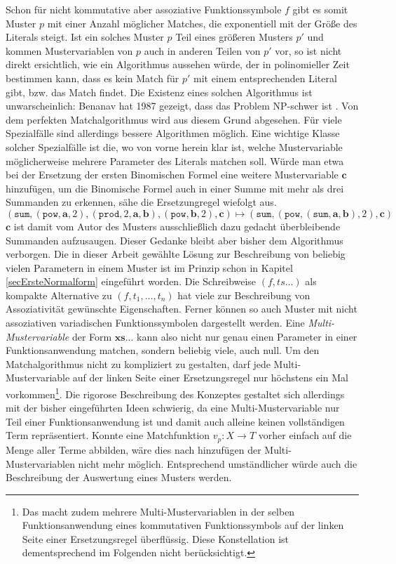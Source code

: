 Schon für nicht kommutative aber assoziative Funktionssymbole $f$ gibt es somit Muster $p$ mit einer Anzahl möglicher Matches, die exponentiell mit der Größe des Literals steigt. Ist ein solches Muster $p$ Teil eines größeren Musters $p'$ und kommen Mustervariablen von $p$ auch in anderen Teilen von $p'$ vor, so ist nicht direkt ersichtlich, wie ein Algorithmus aussehen würde, der in polinomieller Zeit bestimmen kann, dass es kein Match für $p'$ mit einem entsprechenden Literal gibt, bzw. das Match findet. Die Existenz eines solchen Algorithmus ist unwarscheinlich: Benanav hat 1987 gezeigt, dass das Problem NP-schwer ist \cite{NPHardMatching}.
Von dem perfekten Matchalgorithmus wird aus diesem Grund abgesehen. Für viele Spezialfälle sind allerdings bessere Algorithmen möglich. Eine wichtige Klasse solcher Spezialfälle ist die, wo von vorne herein klar ist, welche Mustervariable möglicherweise mehrere Parameter des Literals matchen soll. Würde man etwa bei der Ersetzung der ersten Binomischen Formel eine weitere Mustervariable $\mathbf c$ hinzufügen, um die Binomische Formel auch in einer Summe mit mehr als drei Summanden zu erkennen, sähe die Ersetzungregel wiefolgt aus.
$$(\texttt{sum}, (\texttt{pow}, \mathbf a, 2), (\texttt{prod}, 2, \mathbf a, \mathbf b), (\texttt{pow}, \mathbf b, 2), \mathbf c) \mapsto (\texttt{sum}, (\texttt{pow}, (\texttt{sum}, \mathbf a, \mathbf b), 2), \mathbf c)$$
$\mathbf c$ ist damit vom Autor des Musters ausschließlich dazu gedacht überbleibende Summanden \glqq aufzusaugen\grqq{}. Dieser Gedanke bleibt aber bisher dem Algorithmus verborgen.
Die in dieser Arbeit gewählte Lösung zur Beschreibung von beliebig vielen Parametern in einem Muster ist im Prinzip schon in Kapitel \ref{secErsteNormalform} eingeführt worden. Die Schreibweise $(f, ts...)$ als kompakte Alternative zu $(f, t_1, \dots, t_n)$ hat viele zur Beschreibung von Assoziativität gewünschte Eigenschaften. Ferner können so auch Muster mit nicht assoziativen variadischen Funktionssymbolen dargestellt werden. Eine \textit{Multi-Mustervariable} der Form $\mathbf{xs...}$ kann also nicht nur genau einen Parameter in einer Funktionsanwendung matchen, sondern beliebig viele, auch null. Um den Matchalgorithmus nicht zu kompliziert zu gestalten, darf jede Multi-Mustervariable auf der linken Seite einer Ersetzungsregel nur höchstens ein Mal vorkommen\footnote{Das macht zudem mehrere Multi-Mustervariablen in der selben Funktionsanwendung eines kommutativen Funktionssymbols auf der linken Seite einer Ersetzungsregel überflüssig. Diese Konstellation ist dementsprechend im Folgenden nicht berücksichtigt.}. Die rigorose Beschreibung des Konzeptes gestaltet sich allerdings mit der bisher eingeführten Ideen schwierig, da eine Multi-Mustervariable nur Teil einer Funktionsanwendung ist und damit auch alleine keinen vollständigen Term repräsentiert. Konnte eine Matchfunktion $v_p \colon X \rightarrow T$ vorher einfach auf die Menge aller Terme abbilden, wäre dies nach hinzufügen der Multi-Mustervariablen nicht mehr möglich. Entsprechend umständlicher würde auch die Beschreibung der Auswertung eines Musters werden. \\

